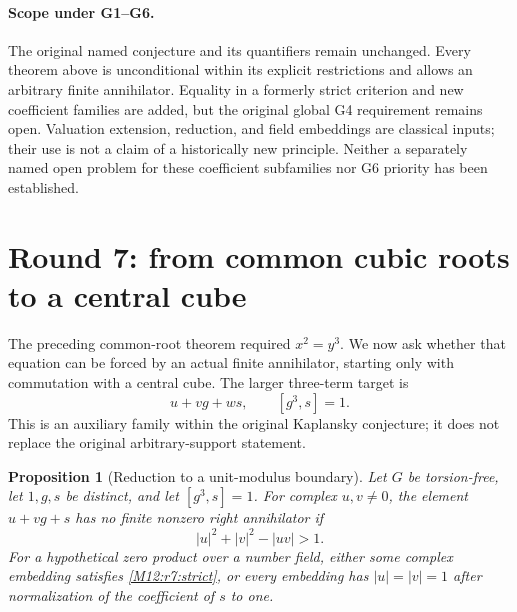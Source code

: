 \documentclass[11pt,a4paper,oneside]{report}
\newtheorem{proposition}[theorem]{Proposition}
\theoremstyle{definition}
\theoremstyle{remark}
\begin{document}
\paragraph{Scope under G1--G6.}
The original named conjecture and its quantifiers remain unchanged.
Every theorem above is unconditional within its explicit
restrictions and allows an arbitrary finite annihilator. Equality
in a formerly strict criterion and new coefficient families are
added, but the original global G4 requirement remains open.
Valuation extension, reduction, and field embeddings are classical
inputs; their use is not a claim of a historically new principle.
Neither a separately named open problem for these coefficient
subfamilies nor G6 priority has been established.

\section{Round 7: from common cubic roots to a central cube}
\label{M12:r7:section}

The preceding common-root theorem required $x^2=y^3$. We now ask whether
that equation can be forced by an actual finite annihilator, starting
only with commutation with a central cube. The larger three-term target is
\begin{equation}\label{M12:r7:target}
 u+vg+ws,\qquad [g^3,s]=1.
\end{equation}
This is an auxiliary family within the original Kaplansky conjecture;
it does not replace the original arbitrary-support statement.

\begin{proposition}[Reduction to a unit-modulus boundary]
\label{M12:r7:boundary-reduction}
Let $G$ be torsion-free, let $1,g,s$ be distinct, and let $[g^3,s]=1$.
For complex $u,v\ne0$, the element $u+vg+s$ has no finite nonzero
right annihilator if
\begin{equation}\label{M12:r7:strict}
 |u|^2+|v|^2-|uv|>1.
\end{equation}
For a hypothetical zero product over a number field, either some
complex embedding satisfies \eqref{M12:r7:strict}, or every embedding has
$|u|=|v|=1$ after normalization of the coefficient of $s$ to one.
\end{proposition}
\end{document}
